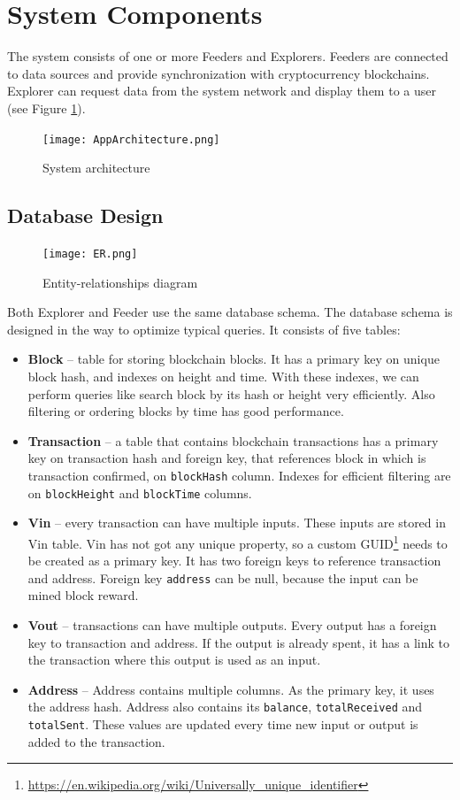 \section{System Components}
The system consists of one or more Feeders and Explorers. Feeders are connected to data sources and provide synchronization with cryptocurrency blockchains. Explorer can request data from the system network and display them to a user (see Figure \ref{systemArchitecture}).

\begin{figure}[h]
    \centering
    \texttt{[image: AppArchitecture.png]}
    \caption{System architecture}
    \label{systemArchitecture}
\end{figure}

\subsection{Database Design}
\label{design}

\begin{figure}[h]
    \centering
    \texttt{[image: ER.png]}
    \caption{Entity-relationships diagram}
    \label{er}
\end{figure}

Both Explorer and Feeder use the same database schema. The database schema is designed in the way to optimize typical queries. It consists of five tables:
\begin{itemize}
    \item \textbf{Block} -- table for storing blockchain blocks. It has a primary key on unique block hash, and indexes on height and time. With these indexes, we can perform queries like search block by its hash or height very efficiently. Also filtering or ordering blocks by time has good performance.
    \item \textbf{Transaction} -- a table that contains blockchain transactions has a primary key on transaction hash and foreign key, that references block in which is transaction confirmed, on \texttt{blockHash} column. Indexes for efficient filtering are on \texttt{blockHeight} and \texttt{blockTime} columns. 
    \item \textbf{Vin} -- every transaction can have multiple inputs. These inputs are stored in Vin table. Vin has not got any unique property, so a custom GUID\footnote{\url{https://en.wikipedia.org/wiki/Universally_unique_identifier}} needs to be created as a primary key. It has two foreign keys to reference transaction and address. Foreign key \texttt{address} can be null, because the input can be mined block reward.
    \item \textbf{Vout} -- transactions can have multiple outputs. Every output has a foreign key to transaction and address. If the output is already spent, it has a link to the transaction where this output is used as an input.
    \item \textbf{Address} -- Address contains multiple columns. As the primary key, it uses the address hash. Address also contains its \texttt{balance}, \texttt{totalReceived} and \texttt{totalSent}. These values are updated every time new input or output is added to the transaction.  
\end{itemize}




